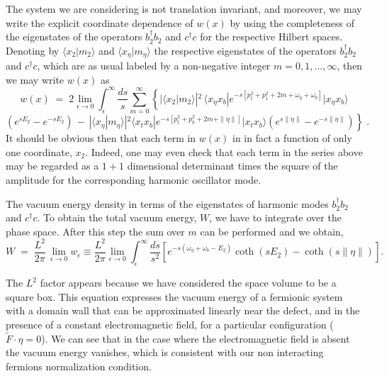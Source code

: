\documentclass[a4paper,12pt]{article}
\newcommand{\Fd}{\widetilde{F}}
\newcommand{\n}{\eta}
\newcommand{\w}{\omega}
\begin{document}
The system we are considering is not translation invariant, and
moreover, we may write the explicit coordinate dependence of $w(x)$ by
using the completeness of the eigenstates of the operators $b_2^\dagger b_2$
and $c^\dagger c$ for the respective Hilbert spaces. Denoting by
$\langle x_2|m_{2}\rangle$ and $\langle x_\eta|m_{\n}\rangle$ the respective eigenstates of the
operators $b_{2}^{\dagger}b_{2}$ and $c^{\dagger}c$, which are as usual labeled by
a non-negative integer $m=0,1,\ldots,\infty$, then we may write $w(x)$ as
$$
w(x)\;=\; 2 \lim_{\epsilon \to 0} \int_\epsilon^\infty \frac{ds}{s} \sum_{m=0}^\infty \left\{ |\langle x_2|m_2\rangle|^2 \,
\langle x_{\n} x_b|e^{-s[p_t^2+p_1^2+2m+\w_\n+\w_b]}|x_{\n} x_b\rangle 
\right.$$
\begin{equation}\label{wtr2}
\left. (e^{sE_2}-e^{-sE_2}) \,-\, |\langle x_{\eta}|m_\n \rangle|^2 
\langle x_t x_b|e^{-s[p_t^2+p_b^2+2m+\|\n\|]}|x_t x_b\rangle 
(e^{s\|\n\|}-e^{-s\|\n\|}) \right\}\;.
\end{equation}
It should be obvious then that each term in $w(x)$ in in fact a 
function of only one coordinate, $x_2$. Indeed, one may even check that
each term in the series above may be regarded as a $1+1$ dimensional
determinant times the square of the amplitude for the corresponding
harmonic oscillator mode. 


The vacuum energy density in terms of the eigenstates of harmonic
modes $b_{2}^{\dagger}b_{2}$ and $c^{\dagger}c$. To obtain the total vacuum
energy, $W$, we have to integrate over the phase space. After this
step the sum over $m$ can be performed and we obtain,
\begin{equation}\label{wtr2bis}
W\;=\;\frac{L^2}{2\pi}\,\lim_{\epsilon \to 0}w_{\epsilon}\equiv \frac{L^2}{2\pi} \lim_{\epsilon \to 0} \int_\epsilon
^\infty \frac{ds}{s^2}
[e^{-s(\w_\n+\w_b-E_2)}\coth(sE_2)-\coth(s\|\n\|)].
\end{equation}

The $L^2$ factor appears because we have considered the space volume
to be a square box. This equation expresses the vacuum energy of a
fermionic system with a domain wall that can be approximated linearly
near the defect, and in the presence of a constant electromagnetic
field, for a particular configuration ($\Fd \cdot \n=0$). We can see that
in the case where the electromagnetic field is absent the vacuum
energy vanishes, which is consistent with our non interacting fermions
normalization condition.
\end{document}
